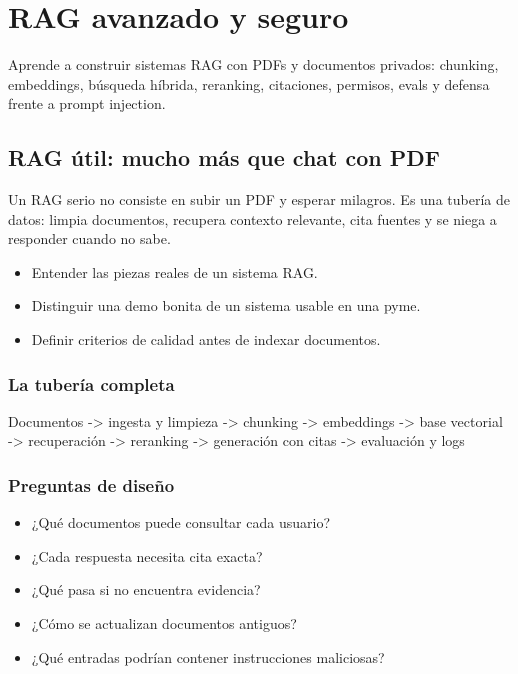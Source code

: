 \documentclass[11pt,a4paper]{book}
\begin{document}
\part{RAG avanzado y seguro}
Aprende a construir sistemas RAG con PDFs y documentos privados: chunking, embeddings, búsqueda híbrida, reranking, citaciones, permisos, evals y defensa frente a prompt injection.

\chapter{RAG útil: mucho más que chat con PDF}
Un RAG serio no consiste en subir un PDF y esperar milagros. Es una tubería de datos: limpia documentos, recupera contexto relevante, cita fuentes y se niega a responder cuando no sabe.

\begin{itemize}\item Entender las piezas reales de un sistema RAG.\end{itemize}
\begin{itemize}\item Distinguir una demo bonita de un sistema usable en una pyme.\end{itemize}
\begin{itemize}\item Definir criterios de calidad antes de indexar documentos.\end{itemize}
\section{La tubería completa}
\begin{codebox}
Documentos
  -> ingesta y limpieza
  -> chunking
  -> embeddings
  -> base vectorial
  -> recuperación
  -> reranking
  -> generación con citas
  -> evaluación y logs
\end{codebox}
\section{Preguntas de diseño}
\begin{itemize}\item ¿Qué documentos puede consultar cada usuario?\end{itemize}
\begin{itemize}\item ¿Cada respuesta necesita cita exacta?\end{itemize}
\begin{itemize}\item ¿Qué pasa si no encuentra evidencia?\end{itemize}
\begin{itemize}\item ¿Cómo se actualizan documentos antiguos?\end{itemize}
\begin{itemize}\item ¿Qué entradas podrían contener instrucciones maliciosas?\end{itemize}
\end{document}
